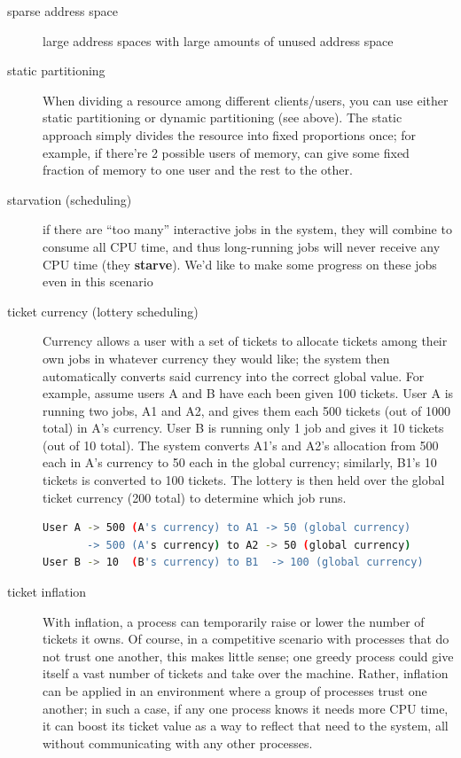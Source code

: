 \begin{description}
\item[sparse address space] large address spaces with large amounts of unused address space

\item[static partitioning] When dividing a resource among different clients/users, you can use either static partitioning or dynamic partitioning (see above). The static approach simply divides the resource into fixed proportions once; for example, if there're 2 possible users of memory, can give some fixed fraction of memory to one user and the rest to the other.

\item[starvation (scheduling)]  if there are ``too many'' interactive jobs in the system, they will combine to consume all CPU time, and thus long-running jobs will never receive any CPU time (they \textbf{starve}). We'd like to make some progress on these jobs even in this scenario


\item[ticket currency (lottery scheduling)] Currency allows a user with a set of tickets to allocate tickets among their own jobs in whatever currency they
would like; the system then automatically converts said currency into the
correct global value. For example, assume users A and B have each been given 100 tickets. User A is running two jobs, A1 and A2, and gives them each 500 tickets (out of 1000 total) in A's currency. User B is running only 1 job and gives it 10 tickets (out of 10 total). The system converts A1's and A2's allocation from 500 each in A's currency to 50 each in the global currency; similarly, B1's 10 tickets is converted to 100 tickets. The lottery is then held over the global ticket currency (200 total) to determine which job runs.
\begin{lstlisting}[language=bash]
User A -> 500 (A's currency) to A1 -> 50 (global currency)
       -> 500 (A's currency) to A2 -> 50 (global currency)
User B -> 10  (B's currency) to B1  -> 100 (global currency)
\end{lstlisting}

\item[ticket inflation] With inflation, a process can temporarily raise or lower the number of tickets it owns. Of course, in a competitive scenario with processes that do not trust one another, this makes little sense; one greedy process could give itself a vast number of tickets and take over the machine. Rather, inflation can be applied in an environment where a group of processes trust one another; in such a case, if any one process knows it needs more CPU time, it can boost its ticket value as a way to reflect that need to the system, all without communicating with any other processes.


\end{description}
